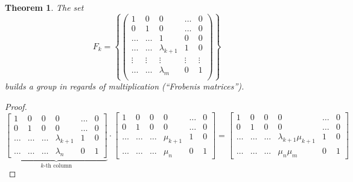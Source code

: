 \documentclass[a4paper,landscape,twocolumn]{article}
\newcommand\set[1]{\left\{#1\right\}}
\newtheorem{theorem}{Theorem}
\begin{document}
\begin{theorem}
  \label{satz-6.48}
  The set
  \[
    F_k = \set{\begin{pmatrix}
      1 & 0 & 0 & \ldots & 0 \\
      0 & 1 & 0 & \ldots & 0 \\
      \ldots & \ldots & 1 & 0 & 0 \\
      \ldots & \ldots & \lambda_{k+1} & 1 & 0 \\
      \vdots & \vdots & \vdots & \vdots & \vdots \\
      \ldots & \ldots & \lambda_{m} & 0 & 1 \\
    \end{pmatrix}}
  \]
  builds a group in regards of multiplication (\enquote{Frobenis matrices}).
\end{theorem}
\begin{proof}
  \[
    \underbrace{
    \begin{bmatrix}
      1 & 0 & 0 & 0 & \ldots & 0 \\
      0 & 1 & 0 & 0 & \ldots & 0 \\
      \ldots & \ldots & \ldots & \lambda_{k+1} & 1 & 0 \\
      \ldots & \ldots & \ldots & \lambda_{n} & 0 & 1
    \end{bmatrix}
    }_{\text{$k$-th column}}
    \cdot
    \begin{bmatrix}
      1 & 0 & 0 & 0 & \ldots & 0 \\
      0 & 1 & 0 & 0 & \ldots & 0 \\
      \ldots & \ldots & \ldots & \mu_{k+1} & 1 & 0 \\
      \ldots & \ldots & \ldots & \mu_{n} & 0 & 1
    \end{bmatrix}
    =
    \begin{bmatrix}
      1 & 0 & 0 & 0 & \ldots & 0 \\
      0 & 1 & 0 & 0 & \ldots & 0 \\
      \ldots & \ldots & \ldots & \lambda_{k+1} \mu_{k+1} & 1 & 0 \\
      \ldots & \ldots & \ldots & \mu_{n} \mu_{m} & 0 & 1
    \end{bmatrix}
  \]
\end{proof}
\end{document}
